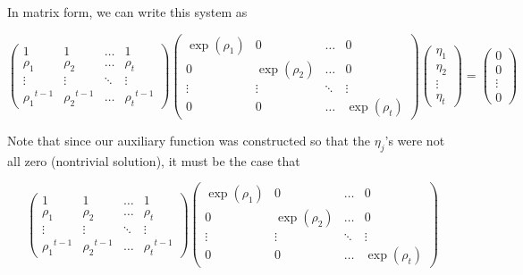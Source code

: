 \documentclass[a4paper, 11pt]{book}
\begin{document}
In matrix form, we can write this system as 

\[
    \begin{pmatrix}
        1 & 1 & \hdots & 1 \\
        \rho_{1} & \rho_{2} & \hdots & {\rho_t} \\ 
        \vdots & \vdots & \ddots & \vdots \\
        {\rho_{1}}^{t-1} & {\rho_{2}}^{t-1} & \hdots & {\rho_t}^{t-1}
    \end{pmatrix} 
    \begin{pmatrix}
        \exp(\rho_1) & 0 & \hdots & 0 \\
        0 & \exp(\rho_2) & \hdots & 0 \\
        \vdots & \vdots & \ddots & \vdots \\
        0 & 0 & \hdots & \exp(\rho_t) 
    \end{pmatrix} 
    \begin{pmatrix}
        \eta_1 \\ \eta_2 \\ \vdots \\ \eta_t
    \end{pmatrix} = 
    \begin{pmatrix}
        0 \\ 0 \\ \vdots \\ 0
    \end{pmatrix} 
\]

Note that since our auxiliary function was constructed so that the $\eta_j$'s were not all zero (nontrivial solution), it must be the case that 

\[
    \begin{pmatrix}
        1 & 1 & \hdots & 1 \\
        \rho_{1} & \rho_{2} & \hdots & {\rho_t} \\ 
        \vdots & \vdots & \ddots & \vdots \\
        {\rho_{1}}^{t-1} & {\rho_{2}}^{t-1} & \hdots & {\rho_t}^{t-1}
    \end{pmatrix} 
    \begin{pmatrix}
        \exp(\rho_1) & 0 & \hdots & 0 \\
        0 & \exp(\rho_2) & \hdots & 0 \\
        \vdots & \vdots & \ddots & \vdots \\
        0 & 0 & \hdots & \exp(\rho_t) 
    \end{pmatrix}\] 
\end{document}
